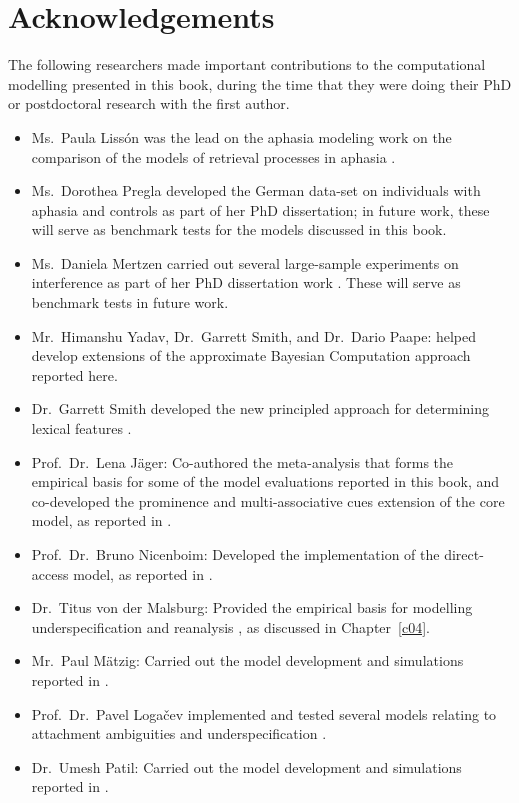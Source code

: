 
\chapter*{Acknowledgements}

The following researchers made important contributions to the  computational modelling presented in this book, during the time that they were doing their PhD or postdoctoral research with the first author.
\begin{itemize}
\item Ms.\ Paula Liss{\'o}n was the lead on the aphasia modeling work on the comparison of the models of retrieval processes in aphasia \citep{LissonEtAl2020}.
\item Ms.\ Dorothea Pregla developed the German data-set on individuals with aphasia and  controls as part of her PhD dissertation; in future work, these will serve as benchmark tests for the models discussed in this book.
\item Ms.\ Daniela Mertzen carried out several large-sample experiments on interference as part of her PhD dissertation work \citep{MertzenEtAlAMLaP2019}.  These will serve as benchmark tests in future work.
\item Mr.\ Himanshu Yadav, Dr.\ Garrett Smith, and Dr.\ Dario Paape: helped develop extensions of the approximate Bayesian Computation approach  reported here. 
\item Dr.\ Garrett Smith developed the new principled approach for determining lexical features \citep{smith2019smithvasishthfeatures}. 
\item Prof.\ Dr.\  Lena J\"ager: Co-authored the meta-analysis \citep{JaegerEngelmannVasishth2017} that forms the empirical basis for some of the model evaluations reported in this book, and co-developed the prominence and multi-associative cues extension of the core model, as reported in \cite{EngelmannJaegerVasishth2019}.
\item Prof.\ Dr.\  Bruno  Nicenboim: Developed the implementation of the direct-access model, as reported in \cite{NicenboimRetrieval2018}.
 \item Dr.\ Titus von der Malsburg: Provided the empirical  basis for  modelling underspecification and reanalysis \citep{MalsburgVasishth2013}, as discussed in Chapter~\ref{c04}.
 \item Mr.\ Paul M\"atzig: Carried out the model development and simulations reported in \cite{MaetzigEtAltopics2018}.
 \item Prof.\ Dr.\ Pavel Loga{\v c}ev implemented and tested several models relating to attachment ambiguities and underspecification \citep{LogacevMultiple,LogacevVasishthQJEP2016}. 
 \item Dr.\ Umesh Patil: Carried out the model development and simulations reported in \cite{PatilEtAl2016}.
 \end{itemize}

